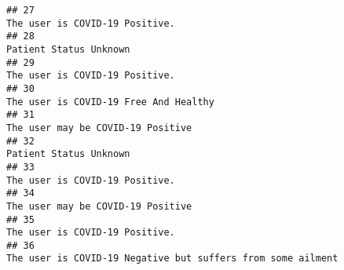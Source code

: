 \documentclass[
]{article}
\begin{document}
\begin{verbatim}
## 27                                                                                                                                                                                                                                      The user is COVID-19 Positive.
## 28                                                                                                                                                                                                                                              Patient Status Unknown
## 29                                                                                                                                                                                                                                      The user is COVID-19 Positive.
## 30                                                                                                                                                                                                                               The user is COVID-19 Free And Healthy
## 31                                                                                                                                                                                                                                   The user may be COVID-19 Positive
## 32                                                                                                                                                                                                                                              Patient Status Unknown
## 33                                                                                                                                                                                                                                      The user is COVID-19 Positive.
## 34                                                                                                                                                                                                                                   The user may be COVID-19 Positive
## 35                                                                                                                                                                                                                                      The user is COVID-19 Positive.
## 36                                                                                                                                                                                                         The user is COVID-19 Negative but suffers from some ailment

\end{verbatim}
\end{document}
